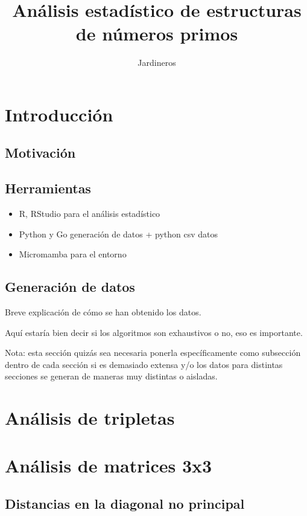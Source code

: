 \documentclass{article}
\title{Análisis estadístico de estructuras de números primos}
\author{Jardineros}
\date{}
\begin{document}
\maketitle

\section{Introducción}



\subsection{Motivación}



\subsection{Herramientas}

\begin{itemize}
    \item R, RStudio para el análisis estadístico
    \item Python y Go generación de datos + python csv datos
    \item Micromamba para el entorno
\end{itemize}

\subsection{Generación de datos}

Breve explicación de cómo se han obtenido los datos.

Aquí estaría bien decir si los algoritmos son exhaustivos o no, eso es importante.

Nota: esta sección quizás sea necesaria ponerla específicamente como subsección dentro de cada sección si es demasiado extensa y/o los datos para distintas secciones se generan de maneras muy distintas o aisladas.

\section{Análisis de tripletas}

\section{Análisis de matrices 3x3}

\subsection{Distancias en la diagonal no principal}
\end{document}
